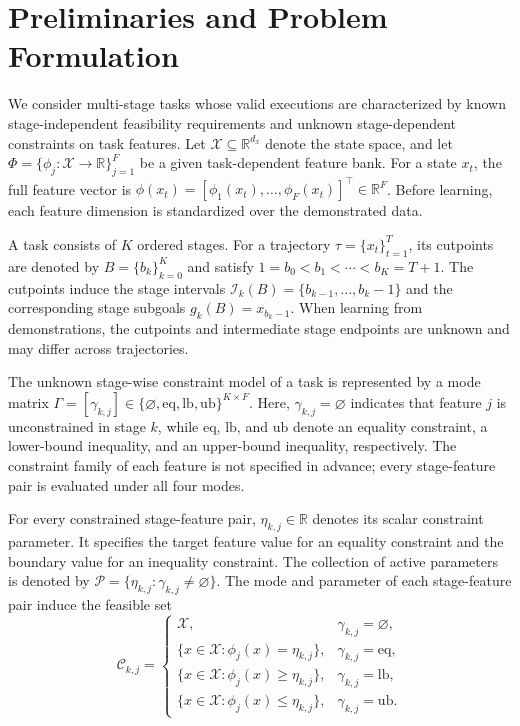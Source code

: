 
\section{Preliminaries and Problem Formulation}
\label{sec:preliminaries}
We consider multi-stage tasks whose valid executions are characterized by known stage-independent feasibility requirements and unknown stage-dependent constraints on task features. Let $\mathcal{X}\subseteq\mathbb{R}^{d_x}$ denote the state space, and let $\Phi=\{\phi_j:\mathcal{X}\rightarrow\mathbb{R}\}_{j=1}^{F}$ be a given task-dependent feature bank. For a state $x_t$, the full feature vector is $\phi(x_t)=[\phi_1(x_t),\dots,\phi_F(x_t)]^\top\in\mathbb{R}^{F}$. Before learning, each feature dimension is standardized over the demonstrated data.

A task consists of $K$ ordered stages. For a trajectory $\tau=\{x_t\}_{t=1}^{T}$, its cutpoints are denoted by $B=\{b_k\}_{k=0}^{K}$ and satisfy $1=b_0<b_1<\cdots<b_K=T+1$. The cutpoints induce the stage intervals $\mathcal{I}_k(B)=\{b_{k-1},\dots,b_k-1\}$ and the corresponding stage subgoals $g_k(B)=x_{b_k-1}$. When learning from demonstrations, the cutpoints and intermediate stage endpoints are unknown and may differ across trajectories.

The unknown stage-wise constraint model of a task is represented by a mode matrix $\Gamma=[\gamma_{k,j}]\in\{\varnothing,\mathrm{eq},\mathrm{lb},\mathrm{ub}\}^{K\times F}$. Here, $\gamma_{k,j}=\varnothing$ indicates that feature $j$ is unconstrained in stage $k$, while $\mathrm{eq}$, $\mathrm{lb}$, and $\mathrm{ub}$ denote an equality constraint, a lower-bound inequality, and an upper-bound inequality, respectively. The constraint family of each feature is not specified in advance; every stage-feature pair is evaluated under all four modes.

For every constrained stage-feature pair, $\eta_{k,j}\in\mathbb{R}$ denotes its scalar constraint parameter. It specifies the target feature value for an equality constraint and the boundary value for an inequality constraint. The collection of active parameters is denoted by $\mathcal{P}=\{\eta_{k,j}:\gamma_{k,j}\neq\varnothing\}$. The mode and parameter of each stage-feature pair induce the feasible set
\begin{equation}
\mathcal{C}_{k,j}
=
\begin{cases}
\mathcal{X},
& \gamma_{k,j}=\varnothing,\\
\{x\in\mathcal{X}:\phi_j(x)=\eta_{k,j}\},
& \gamma_{k,j}=\mathrm{eq},\\
\{x\in\mathcal{X}:\phi_j(x)\geq\eta_{k,j}\},
& \gamma_{k,j}=\mathrm{lb},\\
\{x\in\mathcal{X}:\phi_j(x)\leq\eta_{k,j}\},
& \gamma_{k,j}=\mathrm{ub}.
\end{cases}
\label{eq:stage_feature_feasible_set}
\end{equation}

